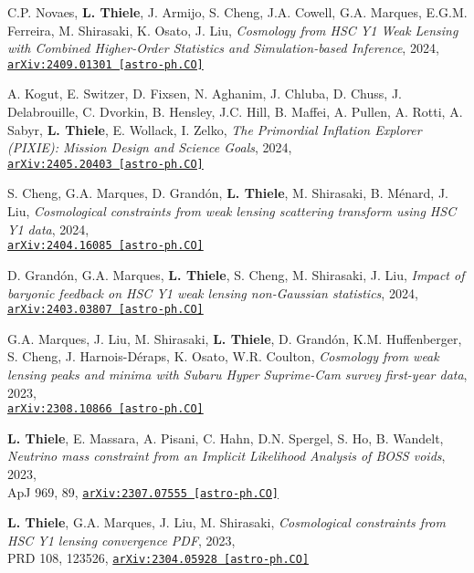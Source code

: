 C.P. Novaes, {\bf L. Thiele}, J. Armijo, S. Cheng, J.A. Cowell, G.A. Marques, E.G.M. Ferreira,
M. Shirasaki, K. Osato, J. Liu,
\emph{Cosmology from HSC Y1 Weak Lensing with Combined Higher-Order Statistics and
Simulation-based Inference}, 2024,\\
\href{https://arxiv.org/abs/2409.01301}{\mbox{\texttt{arXiv:2409.01301 [astro-ph.CO]}}}

A. Kogut, E. Switzer, D. Fixsen, N. Aghanim, J. Chluba, D. Chuss, J. Delabrouille,
C. Dvorkin, B. Hensley, J.C. Hill, B. Maffei, A. Pullen, A. Rotti, A. Sabyr,
{\bf L. Thiele}, E. Wollack, I. Zelko,
\emph{The Primordial Inflation Explorer (PIXIE): Mission Design and Science Goals}, 2024,\\
\href{https://arxiv.org/abs/2405.20403}{\mbox{\texttt{arXiv:2405.20403 [astro-ph.CO]}}}

S. Cheng, G.A. Marques, D. Grand\'on, {\bf L. Thiele}, M. Shirasaki, B. M\'enard, J. Liu,
\emph{Cosmological constraints from weak lensing scattering transform using HSC Y1 data}, 2024,\\
\href{https://arxiv.org/abs/2404.16085}{\mbox{\texttt{arXiv:2404.16085 [astro-ph.CO]}}}

D. Grand\'on, G.A. Marques, {\bf L. Thiele}, S. Cheng, M. Shirasaki, J. Liu,
\emph{Impact of baryonic feedback on HSC Y1 weak lensing non-Gaussian statistics}, 2024,\\
\href{https://arxiv.org/abs/2403.03807}{\mbox{\texttt{arXiv:2403.03807 [astro-ph.CO]}}}

G.A. Marques, J. Liu, M. Shirasaki, {\bf L. Thiele}, D. Grand\'on, K.M. Huffenberger,
S. Cheng, J. Harnois-D\'eraps, K. Osato, W.R. Coulton,
\emph{Cosmology from weak lensing peaks and minima
      with Subaru Hyper Suprime-Cam survey first-year data}, 2023,\\
\href{https://arxiv.org/abs/2308.10866}{\mbox{\texttt{arXiv:2308.10866 [astro-ph.CO]}}}

{\bf L. Thiele}, E. Massara, A. Pisani, C. Hahn, D.N. Spergel, S. Ho, B. Wandelt,
\emph{Neutrino mass constraint from an Implicit Likelihood Analysis of BOSS voids}, 2023,\\
ApJ 969, 89,
\href{https://arxiv.org/abs/2307.07555}{\mbox{\texttt{arXiv:2307.07555 [astro-ph.CO]}}}

{\bf L. Thiele}, G.A. Marques, J. Liu, M. Shirasaki,
\emph{Cosmological constraints from HSC Y1 lensing convergence PDF}, 2023,\\
PRD 108, 123526,
\href{https://arxiv.org/abs/2304.05928}{\mbox{\texttt{arXiv:2304.05928 [astro-ph.CO]}}}

